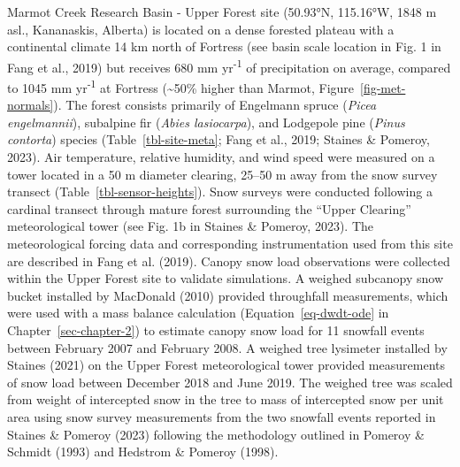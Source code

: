 \documentclass[
  letterpaper,
]{tex/uofsthesis-cs}
\begin{document}
Marmot Creek Research Basin - Upper Forest site (50.93°N, 115.16°W, 1848
m asl., Kananaskis, Alberta) is located on a dense forested plateau with
a continental climate 14 km north of Fortress (see basin scale location
in Fig. 1 in Fang et al., 2019) but receives 680 mm
yr\textsuperscript{-1} of precipitation on average, compared to 1045 mm
yr\textsuperscript{-1} at Fortress (\textasciitilde50\% higher than
Marmot, Figure~\ref{fig-met-normals}). The forest consists primarily of
Engelmann spruce (\emph{Picea engelmannii}), subalpine fir (\emph{Abies
lasiocarpa}), and Lodgepole pine (\emph{Pinus contorta}) species
(Table~\ref{tbl-site-meta}; Fang et al., 2019; Staines \& Pomeroy,
2023). Air temperature, relative humidity, and wind speed were measured
on a tower located in a 50 m diameter clearing, 25--50 m away from the
snow survey transect (Table~\ref{tbl-sensor-heights}). Snow surveys were
conducted following a cardinal transect through mature forest
surrounding the ``Upper Clearing'' meteorological tower (see Fig. 1b in
Staines \& Pomeroy, 2023). The meteorological forcing data and
corresponding instrumentation used from this site are described in Fang
et al. (2019). Canopy snow load observations were collected within the
Upper Forest site to validate simulations. A weighed subcanopy snow
bucket installed by MacDonald (2010) provided throughfall measurements,
which were used with a mass balance calculation
(Equation~\ref{eq-dwdt-ode} in Chapter~\ref{sec-chapter-2}) to estimate
canopy snow load for 11 snowfall events between February 2007 and
February 2008. A weighed tree lysimeter installed by Staines (2021) on
the Upper Forest meteorological tower provided measurements of snow load
between December 2018 and June 2019. The weighed tree was scaled from
weight of intercepted snow in the tree to mass of intercepted snow per
unit area using snow survey measurements from the two snowfall events
reported in Staines \& Pomeroy (2023) following the methodology outlined
in Pomeroy \& Schmidt (1993) and Hedstrom \& Pomeroy (1998).
\end{document}
